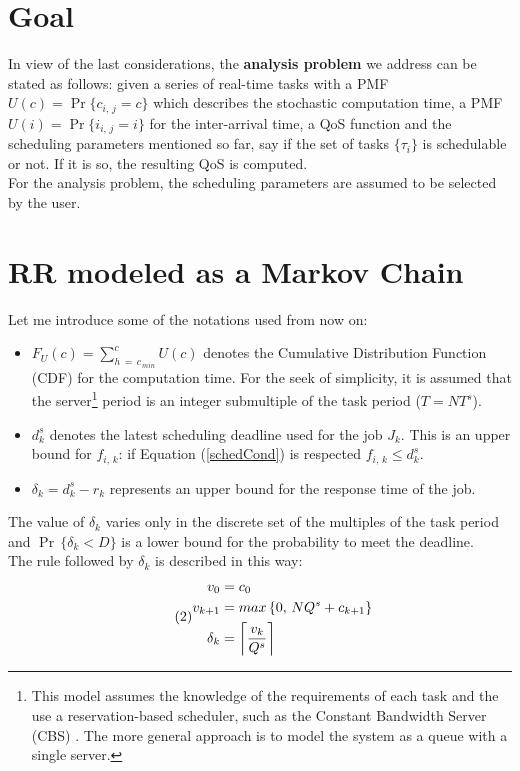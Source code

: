 \section{Goal}
In view of the last considerations, the \textbf{analysis problem} we address can be stated as follows: given a series of real-time tasks with a PMF \( U(c) = \Pr\{c_{i,\,j} = c\} \) which describes the stochastic computation time, a PMF \( U(i) = \Pr\{i_{i,\,j} = i\} \) for the inter-arrival time, a QoS function and the scheduling parameters mentioned so far, say if the set of tasks \( \{\tau_{i}\} \) is schedulable or not. If it is so, the resulting QoS is computed.\\
For the analysis problem, the scheduling parameters are assumed to be selected by the user.

\section{RR modeled as a Markov Chain}
Let me introduce some of the notations used from now on:
\begin{itemize}
  \item \( F_{U}(c) = \displaystyle\sum_{h\,=\,c_{\,min}}^{c} U(c) \) denotes the Cumulative Distribution Function (CDF) for the computation time. For the seek of simplicity, it is assumed that the server\footnote{This model assumes the knowledge of the requirements of each task and the use a reservation-based scheduler, such as the Constant Bandwidth Server (CBS) \cite{pipelines}. The more general approach is to model the system as a queue with a single server.} period is an integer submultiple of the task period (\( T = NT^{s} \)).
  \item \( d_{k}^{s} \) denotes the latest scheduling deadline used for the job \( J_{k} \). This is an upper bound for \( f_{i,\,k} \): if Equation (\ref{schedCond}) is respected \( f_{i,\,k} \leq d_{k}^{s} \).
  \item \( \delta_{k} = d_{k}^{s} - r_{k} \) represents an upper bound for the response time of the job.
\end{itemize}

The value of \( \delta_{k} \) varies only in the discrete set of the multiples of the task period and \( \Pr\,\{\delta_{k} < D\} \) is a lower bound for the probability to meet the deadline.\\
The rule followed by \( \delta_{k} \) is described in this way:
\begin{equation} \tag{2} \label{markovProcess}
\begin{split}
  v_{0} &= c_{0}\\
  v_{k+1} &= max\,\{0,\,NQ^{s} + c_{k+1}\}\\
  \delta_{k} &= \ceil[\bigg]{\frac{v_{k}}{Q^{s}}}
\end{split}
\end{equation}

